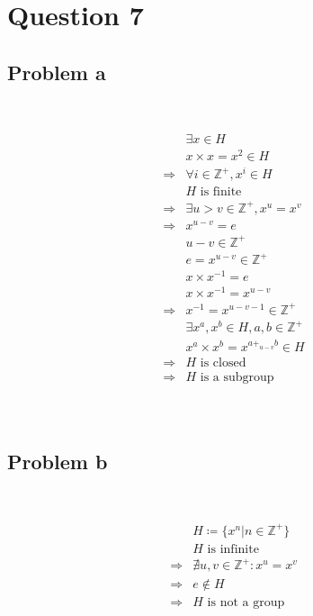 \documentclass{article}
\begin{document}
\newpage

\section*{Question 7}

\subsection*{Problem a}

~

\begin{equation*}
    \begin{split}
        &\exists x\in H\\
        &x\times x=x^2\in H\\
        \Rightarrow&\forall i\in \mathbb{Z}^+ ,x^i\in H\\
        &H\text{ is finite}\\
        \Rightarrow&\exists u>v\in \mathbb{Z}^+,x^u=x^v\\
        \Rightarrow&x^{u-v}=e\\
        &u-v\in \mathbb{Z}^+ \\
        &e=x^{u-v}\in\mathbb{Z}^+ \\
        &x\times x^{-1}=e\\
        &x\times x^{-1}=x^{u-v}\\
        \Rightarrow&x^{-1}=x^{u-v-1}\in \mathbb{Z}^+ \\
        &\exists x^a, x^b\in H, a,b\in\mathbb{Z}^+ \\
        &x^a\times x^b=x^{a+_{u-v}b}\in H\\
        \Rightarrow&H\text{ is closed}\\
        \Rightarrow&H\text{ is a subgroup}\\
    \end{split}
\end{equation*}

~

\subsection*{Problem b}

~

\begin{equation*}
    \begin{split}
        &H\coloneqq \{x^n|n\in\mathbb{Z} ^+\}\\
        &H\text{ is infinite}\\
        \Rightarrow&\nexists u,v\in \mathbb{Z} ^+:x^u=x^v\\
        \Rightarrow&e\notin H\\
        \Rightarrow&H\text{ is not a group}\\
    \end{split}
\end{equation*}
\end{document}
